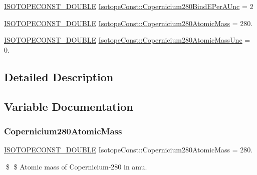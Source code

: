 \begin{DoxyCompactItemize}
\item 
\mbox{\hyperlink{group___isotope_const-_macros_ga8f45a7272ce02c0b4c65c44636ed719a}{I\+S\+O\+T\+O\+P\+E\+C\+O\+N\+S\+T\+\_\+\+D\+O\+U\+B\+LE}} \mbox{\hyperlink{group___isotope_const-_copernicium-_cn280_gaa9a0126ce0ffa73fafa359c98f4da839}{Isotope\+Const\+::\+Copernicium280\+Bind\+E\+Per\+A\+Unc}} = 2
\item 
\mbox{\hyperlink{group___isotope_const-_macros_ga8f45a7272ce02c0b4c65c44636ed719a}{I\+S\+O\+T\+O\+P\+E\+C\+O\+N\+S\+T\+\_\+\+D\+O\+U\+B\+LE}} \mbox{\hyperlink{group___isotope_const-_copernicium-_cn280_ga744ce914fbe62585e258f80e80505175}{Isotope\+Const\+::\+Copernicium280\+Atomic\+Mass}} = 280.
\item 
\mbox{\hyperlink{group___isotope_const-_macros_ga8f45a7272ce02c0b4c65c44636ed719a}{I\+S\+O\+T\+O\+P\+E\+C\+O\+N\+S\+T\+\_\+\+D\+O\+U\+B\+LE}} \mbox{\hyperlink{group___isotope_const-_copernicium-_cn280_ga995a652caded546b5d85b5a713606741}{Isotope\+Const\+::\+Copernicium280\+Atomic\+Mass\+Unc}} = 0.
\end{DoxyCompactItemize}


\subsection{Detailed Description}


\subsection{Variable Documentation}
\mbox{\label{group___isotope_const-_copernicium-_cn280_ga744ce914fbe62585e258f80e80505175}} 
\subsubsection{\texorpdfstring{Copernicium280\+Atomic\+Mass}{Copernicium280AtomicMass}}
{\footnotesize\ttfamily \mbox{\hyperlink{group___isotope_const-_macros_ga8f45a7272ce02c0b4c65c44636ed719a}{I\+S\+O\+T\+O\+P\+E\+C\+O\+N\+S\+T\+\_\+\+D\+O\+U\+B\+LE}} Isotope\+Const\+::\+Copernicium280\+Atomic\+Mass = 280.}

\$ \$ Atomic mass of Copernicium-\/280 in amu. \mbox{\label{group___isotope_const-_copernicium-_cn280_ga995a652caded546b5d85b5a713606741}} 
